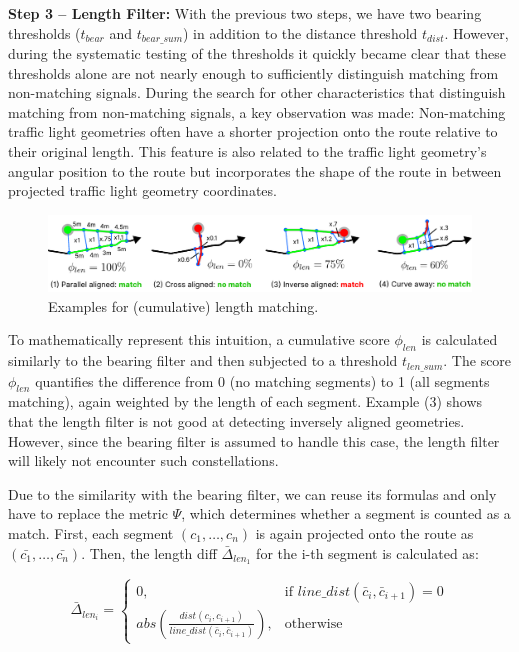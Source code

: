 \textbf{\color{cidarkblue}Step 3 -- Length Filter:} With the previous two steps, we have two bearing thresholds ($t_{bear}$ and $t_{bear\_sum}$) in addition to the distance threshold $t_{dist}$. However, during the systematic testing of the thresholds it quickly became clear that these thresholds alone are not nearly enough to sufficiently distinguish matching from non-matching signals. During the search for other characteristics that distinguish matching from non-matching signals, a key observation was made: Non-matching traffic light geometries often have a shorter projection onto the route relative to their original length. This feature is also related to the traffic light geometry's angular position to the route but incorporates the shape of the route in between projected traffic light geometry coordinates.

\begin{figure}[t]
\centering
\includegraphics[width=\linewidth]{images/sg-selection-length-filter-sum.pdf}
\caption{Examples for (cumulative) length matching.}
\label{fig:sg-selection-length-filter-sum}
\end{figure}

To mathematically represent this intuition, a cumulative score $\phi_{len}$ is calculated similarly to the bearing filter and then subjected to a threshold $t_{len\_sum}$. The score $\phi_{len}$ quantifies the difference from 0 (no matching segments) to 1 (all segments matching), again weighted by the length of each segment. Example (3) shows that the length filter is not good at detecting inversely aligned geometries. However, since the bearing filter is assumed to handle this case, the length filter will likely not encounter such constellations.

Due to the similarity with the bearing filter, we can reuse its formulas and only have to replace the metric $\Psi$, which determines whether a segment is counted as a match. First, each segment $(c_1, \dots, c_n)$ is again projected onto the route as $(\bar{c_1}, \dots, \bar{c_n})$. Then, the length diff $\bar{\Delta}_{len_1}$ for the i-th segment is calculated as:

\begin{equation}
    \bar{\Delta}_{len_i} = 
        \begin{cases}
            0,& \text{if } line\_dist(\bar{c}_i, \bar{c}_{i+1}) = 0 \\
            abs(\frac{dist(c_{i}, c_{i+1})}{line\_dist(\bar{c}_{i}, \bar{c}_{i+1})}),              & \text{otherwise}
        \end{cases}
\end{equation}

